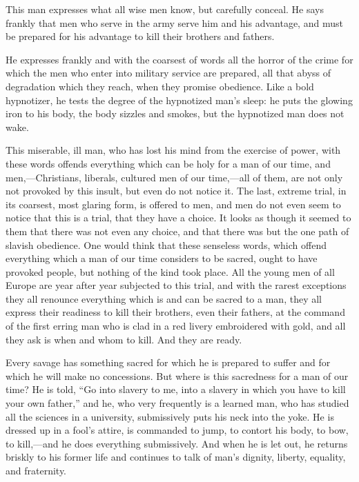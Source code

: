 \documentclass{book}
\begin{document}
This man expresses what all wise men know, but carefully conceal. He says frankly that men who serve in the army serve him and his advantage, and must be prepared for his advantage to kill their brothers and fathers.

He expresses frankly and with the coarsest of words all the horror of the crime for which the men who enter into military service are prepared, all that abyss of degradation which they reach, when they promise obedience. Like a bold hypnotizer, he tests the degree of the hypnotized man’s sleep: he puts the glowing iron to his body, the body sizzles and smokes, but the hypnotized man does not wake.

This miserable, ill man, who has lost his mind from the exercise of power, with these words offends everything which can be holy for a man of our time, and men,—Christians, liberals, cultured men of our time,—all of them, are not only not provoked by this insult, but even do not notice it. The last, extreme trial, in its coarsest, most glaring form, is offered to men, and men do not even seem to notice that this is a trial, that they have a choice. It looks as though it seemed to them that there was not even any choice, and that there was but the one path of slavish obedience. One would think that these senseless words, which offend everything which a man of our time considers to be sacred, ought to have provoked people, but nothing of the kind took place. All the young men of all Europe are year after year subjected to this trial, and with the rarest exceptions they all renounce everything which is and can be sacred to a man, they all express their readiness to kill their brothers, even their fathers, at the command of the first erring man who is clad in a red livery embroidered with gold, and all they ask is when and whom to kill. And they are ready.

Every savage has something sacred for which he is prepared to suffer and for which he will make no concessions. But where is this sacredness for a man of our time? He is told, “Go into slavery to me, into a slavery in which you have to kill your own father,” and he, who very frequently is a learned man, who has studied all the sciences in a university, submissively puts his neck into the yoke. He is dressed up in a fool’s attire, is commanded to jump, to contort his body, to bow, to kill,—and he does everything submissively. And when he is let out, he returns briskly to his former life and continues to talk of man’s dignity, liberty, equality, and fraternity.
\end{document}
